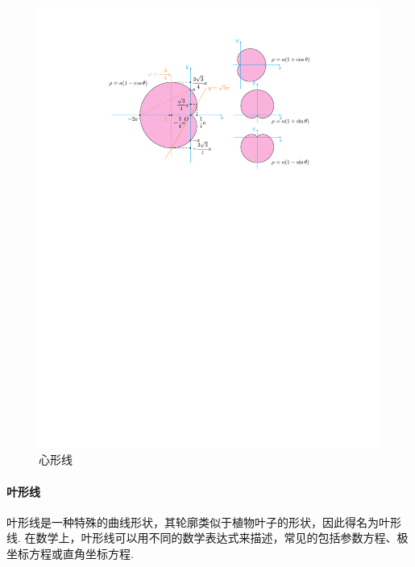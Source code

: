 \begin{figure}[H]
    \centering
    \includegraphics{figures/CardioidLine.pdf}
    \caption{心形线}
    \label{cardioidLine}
\end{figure}

\paragraph{叶形线}

叶形线是一种特殊的曲线形状，其轮廓类似于植物叶子的形状，因此得名为叶形线. 在数学上，叶形线可以用不同的数学表达式来描述，常见的包括参数方程、极坐标方程或直角坐标方程. 

